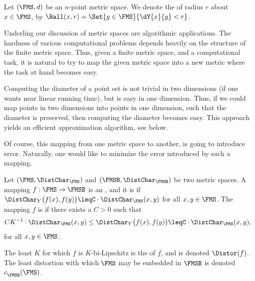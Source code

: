 \begin{defn}
    Let $(\FMS,d)$ be an $n$-point metric space. We denote the
     of radius $r$ about $x \in \FMS$, by
    $\Ball(x,r) = \Set{ y \in \FMS }{ \dY{x}{y} < r }$.
\end{defn}

Underling our discussion of metric spaces are algorithmic
applications. The hardness of various computational problems depends
heavily on the structure of the finite metric space. Thus, given a
finite metric space, and a computational task, it is natural to try to
map the given metric space into a new metric where the task at hand
becomes easy.

\begin{example}
    Computing the diameter of a point set is not trivial in two
    dimensions (if one wants near linear running time), but is easy in
    one dimension. Thus, if we could map points in two dimensions into
    points in one dimension, such that the diameter is preserved, then
    computing the diameter becomes easy. This approach yields an
    efficient approximation algorithm, see  below.
\end{example}

Of course, this mapping from one metric space to another, is going to
introduce error.  Naturally, one would like to minimize the error
introduced by such a mapping.
\begin{defn}
    Let $(\FMS,\DistChar_\FMS)$ and $(\FMSB,\DistChar_\FMSB)$ be two
    metric spaces. A mapping $f:\FMS \to \FMSB$ is an
    , and it is  if
    \begin{math}
        \DistChar_Y\bigl(f(x),f(y) \bigr)%
        \leq%
        C \cdot \DistChar_\FMS(x,y)
    \end{math}
    for all $x,y\in \FMS$.  The mapping $f$ is
     if there exists a $C > 0$ such that
    \begin{equation*}
        CK^{-1} \cdot \DistChar_\FMS(x,y)%
        \leq%
        \DistChar_Y\bigl(f(x),f(y)\bigr)%
        \leq%
        C\cdot
        \DistChar_\FMS(x,y),
    \end{equation*}
    for all $x,y\in \FMS$.
    
    The least $K$ for which $f$ is $K$-bi-Lipschitz is the
     of $f$, and is denoted $\Distor(f)$. The least
    distortion with which $\FMS$ may be embedded in $\FMSB$ is denoted
    $c^{}_\FMSB(\FMS)$.  
     
\end{defn}

